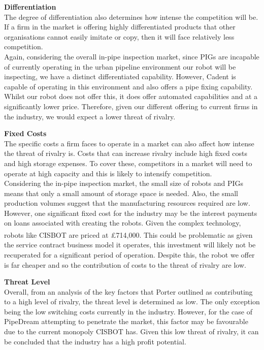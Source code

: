 \documentclass[11pt]{article}		%
\newcommand{\supercite}[1]{\textsuperscript{\cite{#1}}}		%
\begin{document}
		        \textbf{Differentiation}
		        \\
		        The degree of differentiation also determines how intense the competition will be. If a firm in the market is offering highly differentiated products that other organisations cannot easily imitate or copy, then it will face relatively less competition.
		        \\
		        \hspace*{3ex}Again, considering the overall in-pipe inspection market, since PIGs are incapable of currently operating in the urban pipeline environment our robot will be inspecting, we have a distinct differentiated capability. However, Cadent is capable of operating in this environment and also offers a pipe fixing capability. Whilst our robot does not offer this, it does offer automated capabilities and at a significantly lower price. Therefore, given our different offering to current firms in the industry, we would expect a lower threat of rivalry. 
		        
		        \textbf{Fixed Costs}
		        \\
		        The specific costs a firm faces to operate in a market can also affect how intense the threat of rivalry is. Costs that can increase rivalry include high fixed costs and high storage expenses. To cover these, competitors in a market will need to operate at high capacity and this is likely to intensify competition.
		        \\
		        \hspace*{3ex}Considering the in-pipe inspection market, the small size of robots and PIGs means that only a small amount of storage space is needed. Also, the small production volumes suggest that the manufacturing resources required are low. However, one significant fixed cost for the industry may be the interest payments on loans associated with creating the robots. Given the complex technology, robots like CISBOT are priced at £714,000\supercite{cisbotprice}. This could be problematic as given the service contract business model it operates, this investment will likely not be recuperated for a significant period of operation. Despite this, the robot we offer is far cheaper and so the contribution of costs to the threat of rivalry are low. 
		        
		        \textbf{Threat Level}
		        \\
		        Overall, from an analysis of the key factors that Porter outlined as contributing to a high level of rivalry, the threat level is determined as low. The only exception being the low switching costs currently in the industry. However, for the case of PipeDream attempting to penetrate the market, this factor may be favourable due to the current monopoly CISBOT has. Given this low threat of rivalry, it can be concluded that the industry has a high profit potential.
		        
\end{document}
